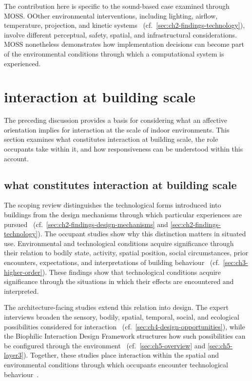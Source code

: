 The contribution here is specific to the sound-based case examined through MOSS. OOther environmental interventions, including lighting, airflow, temperature, projection, and kinetic systems~\cite{rao2025smart} (cf.~\autoref{sec:ch2-findings-technology}), involve different perceptual, safety, spatial, and infrastructural considerations. MOSS nonetheless demonstrates how implementation decisions can become part of the environmental conditions through which a computational system is experienced.



\section{interaction at building scale}
\label{sec:interaction-building-scale}

The preceding discussion provides a basis for considering what an affective orientation implies for interaction at the scale of indoor environments. This section examines what constitutes interaction at building scale, the role occupants take within it, and how responsiveness can be understood within this account.


\subsection{what constitutes interaction at building scale}
\label{subsec:interaction-environmental-relation}

The scoping review distinguishes the technological forms introduced into buildings from the design mechanisms through which particular experiences are pursued~\cite{rao2025smart} (cf.~\autoref{sec:ch2-findings-design-mechanisms} and \autoref{sec:ch2-findings-technology}). The occupant studies show why this distinction matters in situated use. Environmental and technological conditions acquire significance through their relation to bodily state, activity, spatial position, social circumstances, prior encounters, expectations, and interpretations of building behaviour~\cite{rao2026emotion} (cf.~\autoref{sec:ch3-higher-order}). These findings show that technological conditions acquire significance through the situations in which their effects are encountered and interpreted.

The architecture-facing studies extend this relation into design. The expert interviews broaden the sensory, bodily, spatial, temporal, social, and ecological possibilities considered for interaction~\cite{rao2025designing} (cf.~\autoref{sec:ch4-design-opportunities}), while the Biophilic Interaction Design Framework structures how such possibilities can be configured through the environment~\cite{rao2026biophilic} (cf.~\autoref{sec:ch5-overview} and \autoref{sec:ch5-layer3}). Together, these studies place interaction within the spatial and environmental conditions through which occupants encounter technological behaviour~\cite{alavi2018artifacts,alavi2019introduction,wiberg2020interaction}.

